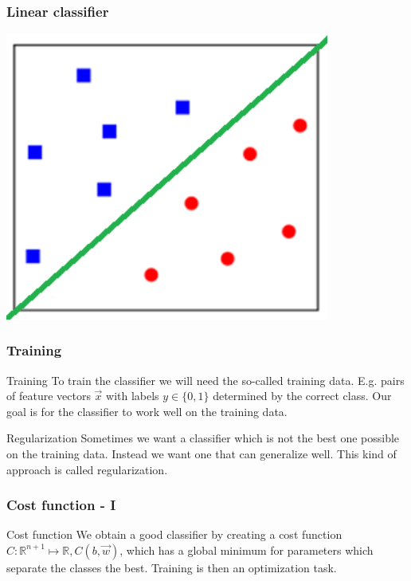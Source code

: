\documentclass{beamer}
\begin{document}
\begin{frame}
\frametitle{Linear classifier}
\center
\includegraphics[width=0.8\textwidth]{lc2.png}
\end{frame}

\begin{frame}
\frametitle{Training}
\begin{block}{Training}
To train the classifier we will need the so-called training data. E.g. pairs of feature vectors $\vec{x}$ with labels $y \in \{0,1\}$ determined by the correct class. Our goal is for the classifier to work well on the training data.
\end{block}

\begin{block}{Regularization}
Sometimes we want a classifier which is not the best one possible on the training data. Instead we want one that can generalize well. This kind of approach is called regularization.
\end{block}
\end{frame}

\begin{frame}
\frametitle{Cost function - I}
\begin{block}{Cost function}
We obtain a good classifier by creating a cost function $C : \mathbb{R}^{n+1} \mapsto \mathbb{R}, C(b, \vec{w})$, which has a global minimum for parameters which separate the classes the best. Training is then an optimization task.
\end{block}
\end{frame}
\end{document}
